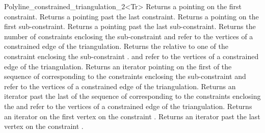 \begin{ccRefClass}{Polyline_constrained_triangulation_2<Tr>}
{Returns a  pointing on the first
constraint.}
\ccGlue
{}
{Returns a  pointing past the last
constraint.}
\ccGlue
{}
{Returns a  pointing on the first
sub-constraint.}
\ccGlue
{}
{Returns a  pointing past the last
sub-constraint.}
\ccGlue
{}
{Returns the number of constraints enclosing the sub-constraint
\ccPrecond {} and  refer to  the vertices
of a constrained edge of the triangulation.}
\ccGlue
{}
{Returns the   relative to  one of the constraint 
enclosing  the sub-constraint  .
\ccPrecond {} and  refer to  the vertices
of a constrained edge of the triangulation.}
\ccGlue
{}
{Returns an iterator pointing on the first 
of the sequence of 
corresponding to the constraints enclosing the sub-constraint
\ccPrecond {} and  refer to  the vertices
of a constrained edge of the triangulation.}
\ccGlue
{}
{Returns an iterator past the last  
of the sequence of 
corresponding to the constraints enclosing the  
\ccPrecond {} and  refer to  the vertices
of a constrained edge of the triangulation.}
\ccGlue
{}
{Returns an iterator on the first vertex on the constraint
.}
\ccGlue
{}
{Returns an iterator past the last vertex on  the constraint
.}





\end{ccRefClass}
